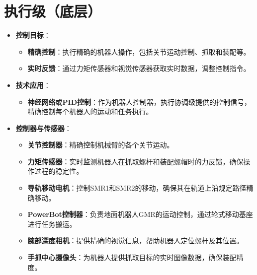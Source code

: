 \documentclass[12pt,a4paper,UTF8]{article}
\begin{document}
\section{执行级（底层）}
\begin{itemize}
    \item \textbf{控制目标}：
    \begin{itemize}
        \item \textbf{精确控制}：执行精确的机器人操作，包括关节运动控制、抓取和装配等。
        \item \textbf{实时反馈}：通过力矩传感器和视觉传感器获取实时数据，调整控制指令。
    \end{itemize}
    \item \textbf{技术应用}：
    \begin{itemize}
        \item \textbf{神经网络}或\textbf{PID控制}：作为机器人控制器，执行协调级提供的控制信号，精确控制每个机器人的运动和任务执行。
    \end{itemize}
    \item \textbf{控制器与传感器}：
    \begin{itemize}
        \item \textbf{关节控制器}：精确控制机械臂的各个关节运动。
        \item \textbf{力矩传感器}：实时监测机器人在抓取螺杆和装配螺帽时的力反馈，确保操作过程的稳定性。
        \item \textbf{导轨移动电机}：控制SMR1和SMR2的移动，确保其在轨道上沿规定路径精确移动。
        \item \textbf{PowerBot控制器}：负责地面机器人GMR的运动控制，通过轮式移动基座进行任务搬运。
        \item \textbf{腕部深度相机}：提供精确的视觉信息，帮助机器人定位螺杆及其位置。
        \item \textbf{手抓中心摄像头}：为机器人提供抓取目标的实时图像数据，确保装配精度。
    \end{itemize}
\end{itemize}
\end{document}
